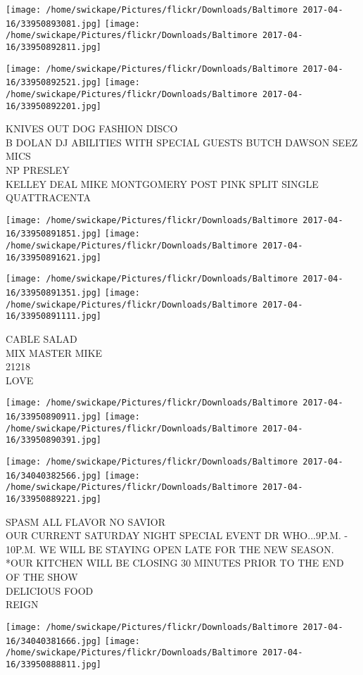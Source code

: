 \documentclass[10pt,letterpaper]{article}
\begin{document}
\texttt{[image: /home/swickape/Pictures/flickr/Downloads/Baltimore 2017-04-16/33950893081.jpg]}
\texttt{[image: /home/swickape/Pictures/flickr/Downloads/Baltimore 2017-04-16/33950892811.jpg]}

\texttt{[image: /home/swickape/Pictures/flickr/Downloads/Baltimore 2017-04-16/33950892521.jpg]}
\texttt{[image: /home/swickape/Pictures/flickr/Downloads/Baltimore 2017-04-16/33950892201.jpg]}

KNIVES OUT DOG FASHION DISCO\\
B DOLAN DJ ABILITIES WITH SPECIAL GUESTS BUTCH DAWSON SEEZ MICS\\
NP PRESLEY\\
KELLEY DEAL MIKE MONTGOMERY POST PINK SPLIT SINGLE QUATTRACENTA
\pagebreak

\texttt{[image: /home/swickape/Pictures/flickr/Downloads/Baltimore 2017-04-16/33950891851.jpg]}
\texttt{[image: /home/swickape/Pictures/flickr/Downloads/Baltimore 2017-04-16/33950891621.jpg]}

\texttt{[image: /home/swickape/Pictures/flickr/Downloads/Baltimore 2017-04-16/33950891351.jpg]}
\texttt{[image: /home/swickape/Pictures/flickr/Downloads/Baltimore 2017-04-16/33950891111.jpg]}

CABLE SALAD\\
MIX MASTER MIKE\\
21218\\
LOVE
\pagebreak

\texttt{[image: /home/swickape/Pictures/flickr/Downloads/Baltimore 2017-04-16/33950890911.jpg]}
\texttt{[image: /home/swickape/Pictures/flickr/Downloads/Baltimore 2017-04-16/33950890391.jpg]}

\texttt{[image: /home/swickape/Pictures/flickr/Downloads/Baltimore 2017-04-16/34040382566.jpg]}
\texttt{[image: /home/swickape/Pictures/flickr/Downloads/Baltimore 2017-04-16/33950889221.jpg]}

SPASM ALL FLAVOR NO SAVIOR\\
OUR CURRENT SATURDAY NIGHT SPECIAL EVENT DR WHO...9P.M. {-} 10P.M. WE WILL BE STAYING OPEN LATE FOR THE NEW SEASON.  *OUR KITCHEN WILL BE CLOSING 30 MINUTES PRIOR TO THE END OF THE SHOW\\
DELICIOUS FOOD\\
REIGN
\pagebreak

\texttt{[image: /home/swickape/Pictures/flickr/Downloads/Baltimore 2017-04-16/34040381666.jpg]}
\texttt{[image: /home/swickape/Pictures/flickr/Downloads/Baltimore 2017-04-16/33950888811.jpg]}
\end{document}
